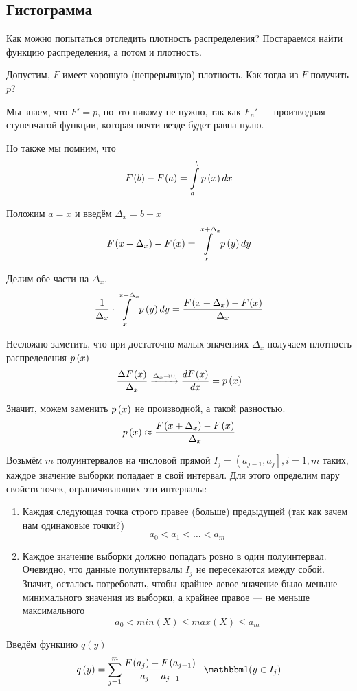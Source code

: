 \subsection{Гистограмма}
Как можно попытаться отследить плотность распределения?
Постараемся найти функцию распределения, а потом и плотность.

Допустим, $F$ имеет хорошую (непрерывную) плотность.
Как тогда из $F$ получить $p$?

Мы знаем, что $F'=p$, но это никому не нужно, так как $F_n'$ --- производная
ступенчатой функции, которая почти везде будет равна нулю.

Но также мы помним, что
$$F_{}\left(b\right)-F_{}\left(a\right)=\int\limits_a^b p\left(x\right) dx$$

Положим $a=x$ и введём $\Delta_x=b-x$
$$F_{}\left(x+\Delta_x\right)-F_{}\left(x\right)=\int\limits_x^{x+\Delta_x} p\left(y\right) dy$$

Делим обе части на $\Delta_x$.
$$\frac{1}{\Delta_x}\cdot\int\limits_x^{x+\Delta_x} p\left(y\right) dy
=\frac{F_{}\left(x+\Delta_x\right)-F_{}\left(x\right)}{\Delta_x}$$

Несложно заметить,
что при достаточно малых значениях $\Delta_x$
получаем плотность распределения $p\left(x\right)$
$$\frac{\Delta F_{}\left(x\right)}{\Delta_x}
\xrightarrow[]{\Delta_x\to 0}
\frac{dF_{}\left(x\right)}{dx}=p\left(x\right)$$

Значит, можем заменить $p\left(x\right)$ не производной, а такой разностью.
$$p\left(x\right)\approx\frac{F_{}\left(x+\Delta_x\right)-F_{}\left(x\right)}{\Delta_x}$$

Возьмём $m$ полуинтервалов на числовой прямой
$I_j=\left(a_{j-1},a_j\right], i=\overline{1,m}$
таких, каждое значение выборки попадает в свой интервал.
Для этого определим пару свойств точек, ограничивающих эти интервалы:
\begin{enumerate}
    \item Каждая следующая точка строго правее (больше) предыдущей
        (так как зачем нам одинаковые точки?)
        $$a_0<a_1<\dots<a_m$$
    \item Каждое значение выборки должно попадать ровно в один полуинтервал.
        Очевидно, что данные полуинтервалы $I_j$ не пересекаются между собой.
        Значит, осталось потребовать, чтобы
        крайнее левое значение было меньше минимального значения из выборки,
        а крайнее правое --- не меньше максимального
        $$a_0<min\left(X\right)\le max\left(X\right)\le a_m$$
\end{enumerate}

Введём функцию $q\left(y\right)$
$$q\left(y\right)
=\sum_{j=1}^m \frac{\cdf{a_j}-\cdf{a_{j-1}}}{a_j-a_{j-1}}
    \cdot\indicator{y\in I_j}$$

